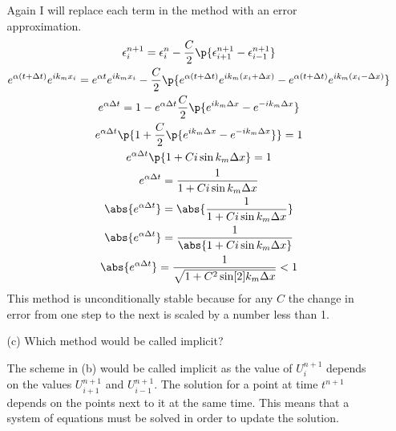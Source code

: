\documentclass[11pt, oneside]{article}
\begin{document}
\begin{enumerate}
\begin{enumerate}
        Again I will replace each term in the method with an error approximation.
        \begin{gather}
          \epsilon^{n+1}_i = \epsilon_i^n - \frac{C}{2} \p{\epsilon_{i+1}^{n+1} - \epsilon_{i-1}^{n+1}} \\
          e^{\alpha (t + \Delta t)} e^{i k_m x_i} = e^{\alpha t} e^{i k_m x_i} - \frac{C}{2} \p{e^{\alpha (t+\Delta t)} e^{i k_m (x_i + \Delta x)} - e^{\alpha (t+\Delta t)} e^{i k_m (x_i - \Delta x)}} \\
          e^{\alpha \Delta t} = 1 - e^{\alpha \Delta t} \frac{C}{2} \p{e^{i k_m \Delta x} -  e^{-i k_m \Delta x}} \\
          e^{\alpha \Delta t} \p{1 +\frac{C}{2} \p{e^{i k_m \Delta x} -  e^{-i k_m \Delta x}}} = 1 \\
          e^{\alpha \Delta t} \p{1 + C i \sin{k_m \Delta x}} = 1 \\
          e^{\alpha \Delta t} = \frac{1}{1 + C i \sin{k_m \Delta x}} \\
          \abs{e^{\alpha \Delta t}} = \abs{\frac{1}{1 + C i \sin{k_m \Delta x}}} \\
          \abs{e^{\alpha \Delta t}} = \frac{1}{\abs{1 + C i \sin{k_m \Delta x}}} \\
          \abs{e^{\alpha \Delta t}} = \frac{1}{\sqrt{1 + C^2 \sin[2]{k_m \Delta x}}} < 1
        \end{gather}
        This method is unconditionally stable because for any $C$ the change in
        error from one step to the next is scaled by a number less than 1.

      \item[(c)] %
        Which method would be called implicit?

        The scheme in (b) would be called implicit as the value of $U^{n+1}_i$
        depends on the values $U^{n+1}_{i+1}$ and $U^{n+1}_{i-1}$.
        The solution for a point at time $t^{n+1}$ depends on the points next
        to it at the same time.
        This means that a system of equations must be solved in order to update
        the solution.
    \end{enumerate}
\end{enumerate}
\end{document}
